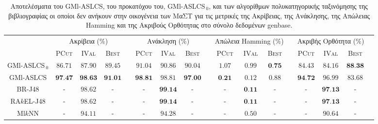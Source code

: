 \begin{landscape}
\begin{table}
\begin{center}
\caption[Αποτελέσματα στο σύνολο δεδομένων genbase.]{Αποτελέσματα του GMl-ASLCS, του προκατόχου του, GMl-ASLCS$_{\:0}$, και των αλγορίθμων πολυκατηγορικής ταξινόμησης της βιβλιογραφίας οι οποίοι δεν ανήκουν στην οικογένεια των ΜαΣΤ για τις μετρικές της Ακρίβειας, της Ανάκλησης, της Απώλειας Hamming και της Ακριβούς Ορθότητας στο σύνολο δεδομένων genbase.}
\label{table:genbaseEvals}
\begin{tabular}{ccccccccccccccccc}
 & \multicolumn{3}{c}{Ακρίβεια (\%)} & & \multicolumn{3}{c}{Ανάκληση (\%)} & & \multicolumn{3}{c}{Απώλεια Hamming (\%)} & & \multicolumn{3}{c}{Ακριβής Ορθότητα (\%)}
\\ 
\cline{2-4} \cline{6-8} \cline{10-12} \cline{14-16}
& \textsc{PCut} & \textsc{IVal} & \textsc{Best} & & \textsc{PCut} & \textsc{IVal} & \textsc{Best} & & \textsc{PCut} & \textsc{IVal} & \textsc{Best} & & \textsc{PCut} & \textsc{IVal} & \textsc{Best}\\ \hline
GMl-ASLCS$_{\:0}$ & $86.71$ & $87.90$ & $89.45$ & & $91.04$ & $90.86$ & $90.04$ & & $1.07$ & $0.99$ & $\textbf{0.75}$ & & $84.43$ & $84.16$ & $\textbf{88.38}$ \\ 
GMl-ASLCS 		  & $\textbf{97.47}$ & $\textbf{98.63}$ & $\textbf{91.01}$ & & $\textbf{98.81}$ & $98.81$ & $\textbf{97.00}$ & & $\textbf{0.21}$	& $0.12$ & $0.88$	& & $\textbf{94.72}$ & $96.99$	& $83.68$ \\
\hline
\hline
BR-J48 			  & - & $98.62$ & - & & - & $\textbf{99.14}$ & - & & -	& $\textbf{0.11}$ & -	& & - & $\textbf{97.13}$	& - \\
RA$k$EL-J48 	  & - & $98.62$ & - & & - & $\textbf{99.14}$ & - & & -	& $\textbf{0.11}$ & -	& & - & $\textbf{97.13}$	& - \\
Ml$k$NN 		  & - & $94.11$ & - & & - & $94.28$ & - & & -	& $0.50$ & -	& & - & $90.64$	& - \\
\hline

\end{tabular} 
\end{center}
\end{table}



\end{landscape}
